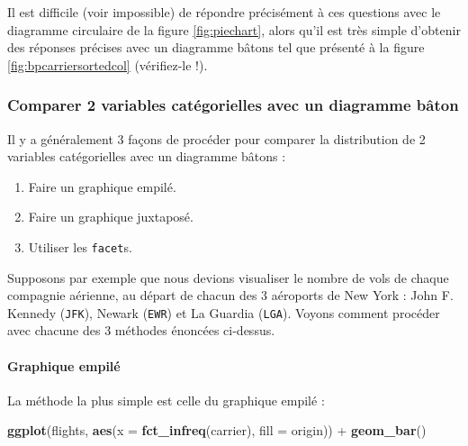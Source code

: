 \documentclass[a4paperpaper,]{article}
\newenvironment{Shaded}{\begin{snugshade}}{\end{snugshade}}
\newcommand{\DataTypeTok}[1]{\textcolor[rgb]{0.00,0.34,0.68}{#1}}
\newcommand{\KeywordTok}[1]{\textcolor[rgb]{0.12,0.11,0.11}{\textbf{#1}}}
\newcommand{\NormalTok}[1]{\textcolor[rgb]{0.12,0.11,0.11}{#1}}
\newcommand{\OperatorTok}[1]{\textcolor[rgb]{0.12,0.11,0.11}{#1}}
\newcommand{\StringTok}[1]{\textcolor[rgb]{0.75,0.01,0.01}{#1}}
\providecommand{\tightlist}{%
  \setlength{\itemsep}{0pt}\setlength{\parskip}{0pt}}
\let\oldparagraph\paragraph
\renewcommand{\paragraph}[1]{\oldparagraph{#1}\mbox{}}
\begin{document}
Il est difficile (voir impossible) de répondre précisément à ces questions avec le diagramme circulaire de la figure \ref{fig:piechart}, alors qu'il est très simple d'obtenir des réponses précises avec un diagramme bâtons tel que présenté à la figure \ref{fig:bpcarriersortedcol} (vérifiez-le !).

\hypertarget{comparer-2-variables-categorielles-avec-un-diagramme-baton}{%
\subsubsection{Comparer 2 variables catégorielles avec un diagramme bâton}\label{comparer-2-variables-categorielles-avec-un-diagramme-baton}}

Il y a généralement 3 façons de procéder pour comparer la distribution de 2 variables catégorielles avec un diagramme bâtons :

\begin{enumerate}
\def\labelenumi{\arabic{enumi}.}
\tightlist
\item
  Faire un graphique empilé.
\item
  Faire un graphique juxtaposé.
\item
  Utiliser les \texttt{facet}s.
\end{enumerate}

Supposons par exemple que nous devions visualiser le nombre de vols de chaque compagnie aérienne, au départ de chacun des 3 aéroports de New York : John F. Kennedy (\texttt{JFK}), Newark (\texttt{EWR}) et La Guardia (\texttt{LGA}). Voyons comment procéder avec chacune des 3 méthodes énoncées ci-dessus.

\hypertarget{graphique-empile}{%
\paragraph{Graphique empilé}\label{graphique-empile}}

La méthode la plus simple est celle du graphique empilé :

\begin{Shaded}
\begin{Highlighting}[]
\KeywordTok{ggplot}\NormalTok{(flights, }\KeywordTok{aes}\NormalTok{(}\DataTypeTok{x =} \KeywordTok{fct_infreq}\NormalTok{(carrier), }\DataTypeTok{fill =}\NormalTok{ origin)) }\OperatorTok{+}
\StringTok{  }\KeywordTok{geom_bar}\NormalTok{()}
\end{Highlighting}
\end{Shaded}
\end{document}
